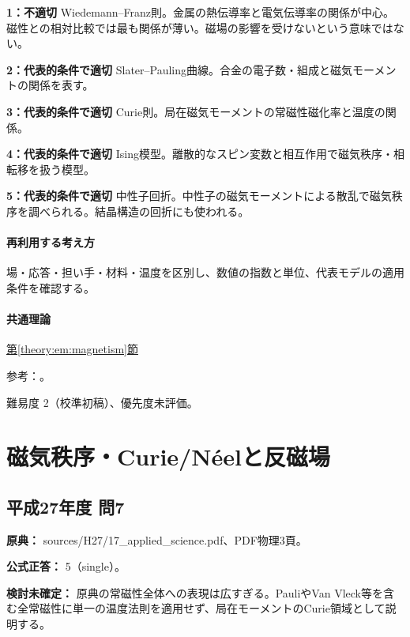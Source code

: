 \noindent\textbf{1：不適切} Wiedemann–Franz則。金属の熱伝導率と電気伝導率の関係が中心。磁性との相対比較では最も関係が薄い。磁場の影響を受けないという意味ではない。\par

\noindent\textbf{2：代表的条件で適切} Slater–Pauling曲線。合金の電子数・組成と磁気モーメントの関係を表す。\par

\noindent\textbf{3：代表的条件で適切} Curie則。局在磁気モーメントの常磁性磁化率と温度の関係。\par

\noindent\textbf{4：代表的条件で適切} Ising模型。離散的なスピン変数と相互作用で磁気秩序・相転移を扱う模型。\par

\noindent\textbf{5：代表的条件で適切} 中性子回折。中性子の磁気モーメントによる散乱で磁気秩序を調べられる。結晶構造の回折にも使われる。\par

\paragraph{再利用する考え方} 場・応答・担い手・材料・温度を区別し、数値の指数と単位、代表モデルの適用条件を確認する。

\paragraph{共通理論} \hyperref[theory:em:magnetism]{第\ref*{theory:em:magnetism}節}

\par 参考：\cite{em51_mit_magnetic_readings,em51_wf}。

\par 難易度 2（校準初稿）、優先度未評価。

\section{磁気秩序・Curie/Néelと反磁場}

\subsection{平成27年度 問7}
\label{q:h27-reg-applied-07}

\noindent\textbf{原典：} sources/H27/17\_applied\_science.pdf、PDF物理3頁。

\textbf{公式正答：} 5（single）。

\par\textbf{検討未確定：} 原典の常磁性全体への表現は広すぎる。PauliやVan Vleck等を含む全常磁性に単一の温度法則を適用せず、局在モーメントのCurie領域として説明する。

